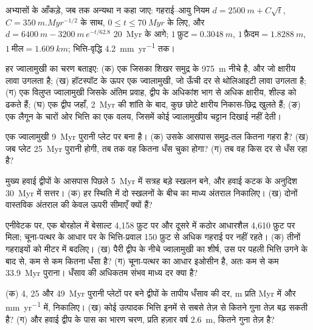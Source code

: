 अभ्यासों के आँकड़े, जब तक अन्यथा न कहा जाए: गहराई–आयु नियम $d = \qty{2500}{m} + C\sqrt t$,
$C = \qty{350}{m.Myr^{-1/2}}$ के साथ, $0 \le t \le \qty{70}{Myr}$ के लिए, और $d = \qty{6400}{m} -
\qty{3200}{m}\,e^{-t/62.8}$ \qty{20}{Myr} के आगे; $1~\text{फ़ुट} = \qty{0.3048}{m}$, $1~\text{फ़ैदम}
= \qty{1.8288}{m}$, $1~\text{मील} = \qty{1.609}{km}$; भित्ति-वृद्धि \qty{4.2}{mm.yr^{-1}} तक।

\begin{exercise}[$\star$]\label{exo:b2:oceanic-islands:1}
हर ज्वालामुखी का चरण बताइए: (क) एक  जिसका शिखर समुद्र के \qty{975}{m} नीचे है, और जो
क्षारीय लावा उगलता है; (ख) हॉटस्पॉट के ऊपर एक ज्वालामुखी, जो ऊँची दर से थोलिआइटी लावा उगलता है; (ग) एक
विलुप्त ज्वालामुखी जिसके अंतिम प्रवाह, द्वीप के अधिकांश भाग से अधिक क्षारीय, शील्ड को ढकते हैं; (घ) एक
द्वीप जहाँ, \qty{2}{Myr} की शांति के बाद, कुछ छोटे क्षारीय निकास-छिद्र खुलते हैं; (ङ) एक लैगून के चारों ओर
भित्ति का एक वलय, जिसमें कोई ज्वालामुखीय चट्टान दिखाई नहीं देती।
\end{exercise}

\begin{exercise}[$\star$]\label{exo:b2:oceanic-islands:2}
एक ज्वालामुखी \qty{9}{Myr} पुरानी प्लेट पर बना है। (क) उसके आसपास समुद्र-तल कितना गहरा है? (ख) जब
प्लेट \qty{25}{Myr} पुरानी होगी, तब तक वह कितना धँस चुका होगा? (ग) तब वह किस दर से धँस रहा है?
\end{exercise}

\begin{exercise}[$\star$]\label{exo:b2:oceanic-islands:3}
मुख्य हवाई द्वीपों के आसपास पिछले \qty{5}{Myr} में सत्रह बड़े स्खलन बने, और
हवाई कटक के अनुदिश \qty{30}{Myr} में सत्तर। (क) हर स्थिति में दो स्खलनों के बीच का माध्य अंतराल
निकालिए। (ख) दोनों वास्तविक अंतराल की केवल ऊपरी सीमाएँ क्यों हैं?
\end{exercise}

\begin{exercise}[$\star$]\label{exo:b2:oceanic-islands:4}
एनीवेटक पर, एक बोरहोल में बेसाल्ट 4,158 फ़ुट पर और दूसरे में कठोर आधारशैल 4,610 फ़ुट पर मिला;
चूना-पत्थर के आधार पर के भित्ति-प्रवाल 150 फ़ुट से अधिक गहराई पर नहीं रहते। (क) तीनों
गहराइयों को मीटर में बदलिए। (ख) पैरी द्वीप के नीचे ज्वालामुखी का शीर्ष, उस पर पहली भित्ति उगने के बाद से,
कम से कम कितना धँसा है? (ग) चूना-पत्थर का आधार इओसीन है, अतः कम से कम
\qty{33.9}{Myr} पुराना। धँसाव की अधिकतम संभव माध्य दर क्या है?
\end{exercise}

\begin{exercise}[$\star\star$]\label{exo:b2:oceanic-islands:5}
(क) 4, 25 और \qty{49}{Myr} पुरानी प्लेटों पर बने द्वीपों के तापीय धँसाव की दर, \unit{m} प्रति \unit{Myr} में और \unit{mm.yr^{-1}} में,
निकालिए। (ख) कोई उत्पादक भित्ति इनमें से सबसे तेज़ से
कितने गुना तेज़ बढ़ सकती है? (ग) और हवाई द्वीप के पास का भारण चरण,
प्रति हज़ार वर्ष \qty{2.6}{m}, कितने गुना तेज़ है?
\end{exercise}

